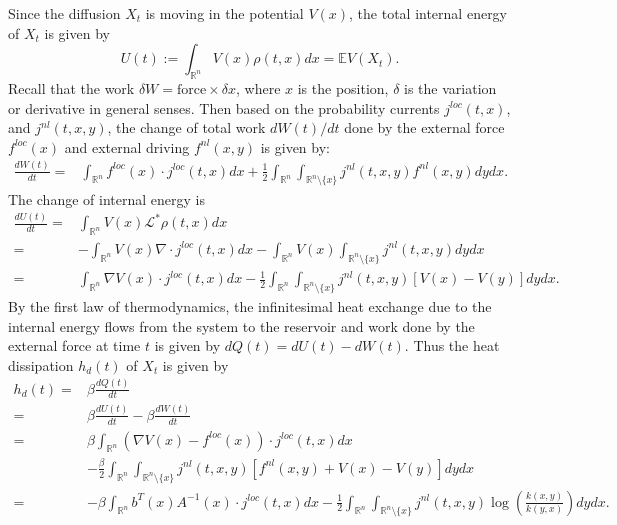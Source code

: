 \documentclass[10pt]{article}
\theoremstyle{definition}
\theoremstyle{remark}
\numberwithin{equation}{section}
\begin{document}
Since the diffusion $X_t$ is moving in the potential $V(x)$, the total internal energy of $X_t$ is given by
\begin{equation*}
    U(t):= \int_{\mathbb{R}^n} V(x) \rho(t,x) dx = \mathbb{E}V(X_t).
\end{equation*}
Recall that the work $\delta W = \text{force} \times \delta x$, where $x$ is the position, $\delta$ is the variation or derivative in general senses.
Then based on the probability currents $j^{loc}(t,x) $, and $j^{nl}(t,x,y)$, the change of total work $dW(t)/dt$ done by the external force $f^{loc}(x)$ and external driving $f^{nl}(x,y)$ is given by:
\begin{align}
   \frac{dW(t)}{dt} = & \int_{\mathbb{R}^n} f^{loc}(x)\cdot j^{loc}(t,x)dx + {\frac{1}{2}}\int_{\mathbb{R}^n}\int_{\mathbb{R}^n \setminus \{x\}} j^{nl}(t,x,y)f^{nl}(x,y)dydx.
\end{align}
The change of internal energy is 
\begin{align}
    \frac{d U(t)}{dt} = & \int_{\mathbb{R}^n} V(x) \mathcal{L}^{\ast} \rho(t,x)dx \nonumber\\
    = & -\int_{\mathbb{R}^n} V(x) \nabla\cdot j^{loc}(t,x)dx - \int_{\mathbb{R}^n}  V(x)\int_{\mathbb{R}^n \setminus \{x\}} j^{nl}(t,x,y) dy dx \nonumber \\
             = & \int_{\mathbb{R}^n} \nabla V(x) \cdot j^{loc}(t,x)dx - \frac{1}{2}\int_{\mathbb{R}^n} \int_{\mathbb{R}^n \setminus \{x\}} j^{nl}(t,x,y)  [V(x) - V(y)] dydx.
\end{align}
By the first law of thermodynamics, the infinitesimal heat exchange {due to the internal energy flows from the system to the reservoir and work done by the external force} at time $t$ is given by $dQ(t) =  dU(t) - dW(t).$ Thus the heat dissipation $h_{d}(t)$ of $X_t$ is given by
\begin{align}\label{HDr}
    h_{d}(t) = & \beta\frac{dQ(t)}{dt}\nonumber\\
             = & \beta\frac{d U(t)}{dt} - \beta \frac{dW(t)}{dt} \nonumber\\
             = & \beta\int_{\mathbb{R}^n} (\nabla V(x) - f^{loc}(x)) \cdot j^{loc}(t,x)dx \nonumber\\
             & - \frac{\beta}{2}\int_{\mathbb{R}^n} \int_{\mathbb{R}^n \setminus \{x\}} j^{nl}(t,x,y)  [f^{nl}(x,y) + V(x) - V(y)] dydx \nonumber \\
             = & -\beta\int_{\mathbb{R}^n} b^T(x) A^{-1}(x)\cdot j^{loc}(t,x)dx - \frac{1}{2}\int_{\mathbb{R}^n}\int_{\mathbb{R}^n \setminus \{x\}} j^{nl}(t,x,y)\log \left( \frac{k(x,y)}{k(y,x)} \right) dydx .
\end{align}
\end{document}
